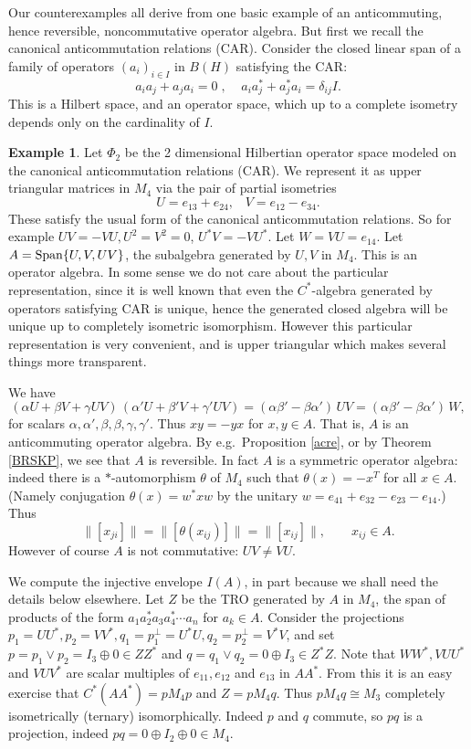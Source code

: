 \documentclass{amsart}
\theoremstyle{remark}
\theoremstyle{definition}
\newtheorem{example}[theorem]{Example}
\numberwithin{equation}{section}
\begin{document}
Our counterexamples all derive from one basic example of an anticommuting, hence reversible, noncommutative  operator algebra. 
But first we recall the canonical anticommutation relations (CAR).  Consider the closed linear span of a family of operators $(a_i)_{i \in I}$ in $B(H)$ satisfying the CAR:
$$a_i a_j + a_j a_i = 0 \; ,  \; \; \; \; a_i a_j^* + a_j^* a_i = \delta_{ij} I.$$
This is a Hilbert space, and an operator space, which  up to a complete isometry depends only on the cardinality of $I$. 


\begin{example} \label{Ex1} Let $\Phi_2$  be the 2 dimensional Hilbertian operator space modeled on the 
canonical anticommutation relations (CAR).  We represent it as upper triangular 
matrices  in $M_4$ via the pair of partial isometries
$$U = e_{13} + e_{24}, \; \; \;  V = e_{12} - e_{34}.$$ 
   These satisfy the usual form of the canonical anticommutation relations.   So for example 
$UV = - VU, U^2 = V^2 = 0$, $U^* V = -V U^*$.   Let $W = VU = e_{14}$. 
Let $A = {\rm Span} \{ U,V,UV \}$, the subalgebra generated by $U, V$ in $M_4$.    This is an operator algebra.   In some sense we do not care about the particular representation, since it is well known that even the $C^*$-algebra generated by operators satisfying CAR is unique, hence the generated closed algebra will be unique up to completely isometric isomorphism.    However this particular representation is very convenient, and is upper triangular which makes several things more transparent. 

We have 
$$(\alpha U + \beta V + \gamma UV) \, (\alpha' U + \beta' V + \gamma' UV) = 
(\alpha \beta' - \beta \alpha') \, UV = (\alpha \beta' - \beta \alpha') \, W, $$
for scalars $\alpha, \alpha', \beta,  \beta,  \gamma, \gamma'$.   Thus $xy = -yx$ for $x, y \in A$.  That is, $A$ is an anticommuting operator algebra.  By e.g.\ Proposition \ref{acre}, or by Theorem \ref{BRSKP}, we see that  $A$ is reversible.   In fact  $A$ is a symmetric operator algebra: indeed 
there is a $*$-automorphism $\theta$ of $M_4$ such that $\theta(x) = -x^T$ for all $x \in A$.  (Namely conjugation 
$\theta(x) = w^* xw$ by the unitary $w = e_{41} + e_{32}
- e_{23} - e_{14}$.)   Thus $$\| [x_{ji} ] \| = \| [ \theta(x_{ij}) ] \| = \| [ x_{ij} ] \| , \qquad x_{ij} \in A .$$  However  of course $A$ is not commutative: $UV \neq VU$. 


We compute the injective envelope $I(A)$, in part because we shall need the details below elsewhere.   Let $Z$ be the TRO generated by $A$ in $M_4$, the span of products of the form $a_1 a_2^* a_3 a_4^* \cdots a_n$ for $a_k \in A.$ 
Consider the projections $p_1 = UU^*, p_2 = VV^*, q_1 = p_1^\perp = U^*U, q_2 = p_2^\perp = V^*V$, and set
$p = p_1 \vee p_2   = I_3 \oplus 0 \in Z Z^*$ and $q = q_1 \vee q_2  = 0 \oplus I_3 \in Z^*Z$.   
Note that $WW^*, V UU^*$ and $VUV^*$ are scalar multiples of $e_{11}, e_{12}$ and $e_{13}$ in $A A^*$.   From this 
it is an easy exercise that $C^*(A A^*) = p M_4 p$ and $Z = p M_4 q$. 
 Thus $p M_4 q \cong M_3$ completely isometrically
(ternary) isomorphically.   Indeed $p$ and $q$ commute, so $pq$ is a projection, indeed $pq = 0 \oplus I_{2} \oplus 0 \in M_4$. 
 

\end{example}
\end{document}
